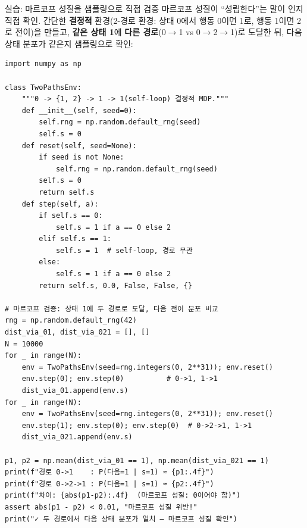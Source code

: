 \documentclass[aspectratio=169,11pt]{beamer}
\begin{document}
\begin{frame}[fragile]{실습: 마르코프 성질을 샘플링으로 직접 검증}
  마르코프 성질이 ``성립한다''는 말이 인지 직접 확인. 간단한 \textbf{결정적} 환경(2-경로 환경:
  상태 0에서 행동 0이면 1로, 행동 1이면 2로 전이)을 만들고,
  \textbf{같은 상태 1}에 \textbf{다른 경로}(0$\to$1 vs
  0$\to$2$\to$1)로 도달한 뒤, 다음 상태 분포가 같은지 샘플링으로
  확인:
  \begin{lstlisting}
import numpy as np

class TwoPathsEnv:
    """0 -> {1, 2} -> 1 -> 1(self-loop) 결정적 MDP."""
    def __init__(self, seed=0):
        self.rng = np.random.default_rng(seed)
        self.s = 0
    def reset(self, seed=None):
        if seed is not None:
            self.rng = np.random.default_rng(seed)
        self.s = 0
        return self.s
    def step(self, a):
        if self.s == 0:
            self.s = 1 if a == 0 else 2
        elif self.s == 1:
            self.s = 1  # self-loop, 경로 무관
        else:
            self.s = 1 if a == 0 else 2
        return self.s, 0.0, False, False, {}

# 마르코프 검증: 상태 1에 두 경로로 도달, 다음 전이 분포 비교
rng = np.random.default_rng(42)
dist_via_01, dist_via_021 = [], []
N = 10000
for _ in range(N):
    env = TwoPathsEnv(seed=rng.integers(0, 2**31)); env.reset()
    env.step(0); env.step(0)          # 0->1, 1->1
    dist_via_01.append(env.s)
for _ in range(N):
    env = TwoPathsEnv(seed=rng.integers(0, 2**31)); env.reset()
    env.step(1); env.step(0); env.step(0)  # 0->2->1, 1->1
    dist_via_021.append(env.s)

p1, p2 = np.mean(dist_via_01 == 1), np.mean(dist_via_021 == 1)
print(f"경로 0->1    : P(다음=1 | s=1) ≈ {p1:.4f}")
print(f"경로 0->2->1 : P(다음=1 | s=1) ≈ {p2:.4f}")
print(f"차이: {abs(p1-p2):.4f}  (마르코프 성질: 0이어야 함)")
assert abs(p1 - p2) < 0.01, "마르코프 성질 위반!"
print("✓ 두 경로에서 다음 상태 분포가 일치 — 마르코프 성질 확인")
  \end{lstlisting}
\end{frame}
\end{document}
